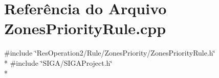 \section{Referência do Arquivo Zones\+Priority\+Rule.\+cpp}
\label{_zones_priority_rule_8cpp}
{\ttfamily \#include \char`\"{}Res\+Operation2/\+Rule/\+Zones\+Priority/\+Zones\+Priority\+Rule.\+h\char`\"{}}\\*
{\ttfamily \#include \char`\"{}S\+I\+G\+A/\+S\+I\+G\+A\+Project.\+h\char`\"{}}\\*

